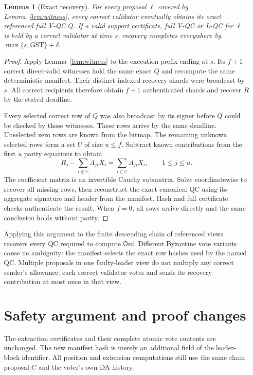 \documentclass[11pt,a4paper]{article}
\newtheorem{lemma}[theorem]{Lemma}
\theoremstyle{definition}
\newcommand{\Ord}{\mathsf{Ord}}
\newcommand{\GST}{\mathrm{GST}}
\begin{document}
\begin{lemma}[Exact recovery]\label{lem:recovery}
For every proposal \(\ell\) covered by Lemma~\ref{lem:witness}, every
correct validator eventually obtains its exact referenced full V-QC \(Q\).
If a valid support certificate, full V-QC or L-QC for \(\ell\) is held by
a correct validator at time \(s\), recovery completes everywhere by
\(\max\{s,\GST\}+\delta\).
\end{lemma}
\begin{proof}
Apply Lemma~\ref{lem:witness} to the execution prefix ending at \(s\).
Its \(f+1\) correct direct-valid witnesses hold the same exact \(Q\) and
recompute the same deterministic manifest. Their distinct indexed recovery
shards were broadcast by \(s\). All correct recipients therefore obtain
\(f+1\) authenticated shards and recover \(R\) by the stated deadline.

Every selected correct row of \(Q\) was also broadcast by its signer before
\(Q\) could be checked by those witnesses. These rows arrive by the same
deadline. Unselected zero rows are known from the bitmap. The remaining
unknown selected rows form a set \(U\) of size \(u\le f\). Subtract known
contributions from the first \(u\) parity equations to obtain
\[
  R_j-\sum_{i\notin U}A_{ji}X_i
       =\sum_{i\in U}A_{ji}X_i,\qquad 1\le j\le u.
\]
The coefficient matrix is an invertible Cauchy submatrix. Solve
coordinatewise to recover all missing rows, then reconstruct the exact
canonical QC using its aggregate signature and header from the manifest.
Hash and full certificate checks authenticate the result. When \(f=0\),
all rows arrive directly and the same conclusion holds without parity.
\end{proof}

Applying this argument to the finite descending chain of referenced views
recovers every QC required to compute \(\Ord\). Different Byzantine vote
variants cause no ambiguity: the manifest selects the exact row hashes
used by the named QC. Multiple proposals in one faulty-leader view do not
multiply any correct sender's allowance; each correct validator votes and
sends its recovery contribution at most once in that view.

\section{Safety argument and proof changes}
\label{sec:safety}

The extraction certificates and their complete atomic vote contents are
unchanged. The new manifest hash is merely an additional field of the
leader-block identifier. All position and extension computations still use
the same chain proposal \(C\) and the voter's own DA history.
\end{document}
